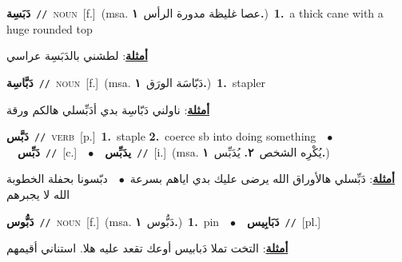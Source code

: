\documentclass[10pt,a4paper,twoside]{article} %
\begin{document}
\begin{multicols}{2}
{\setlength\topsep{0pt}\textbf{\foreignlanguage{arabic}{دَبَسِة}}\ {\color{gray}\texttt{//}\color{black}}\ \textsc{noun}\ [f.]\ \color{gray}(msa. \foreignlanguage{arabic}{عصا غليظة مدورة الرأس}~\foreignlanguage{arabic}{\textbf{١.}})\color{black}\ \textbf{1.}~a thick cane with a huge rounded top\  \begin{flushright}\color{gray}\foreignlanguage{arabic}{\textbf{\underline{\foreignlanguage{arabic}{أمثلة}}}: لطشني بالدَبَسِة عراسي}\end{flushright}\color{black}} \vspace{2mm}

{\setlength\topsep{0pt}\textbf{\foreignlanguage{arabic}{دَبَّاسِة}}\ {\color{gray}\texttt{//}\color{black}}\ \textsc{noun}\ [f.]\ \color{gray}(msa. \foreignlanguage{arabic}{دَبّاسَة الورَق}~\foreignlanguage{arabic}{\textbf{١.}})\color{black}\ \textbf{1.}~stapler\  \begin{flushright}\color{gray}\foreignlanguage{arabic}{\textbf{\underline{\foreignlanguage{arabic}{أمثلة}}}: ناولني دَبّاسِة بدي أدَبِّسلي هالكم ورقة}\end{flushright}\color{black}} \vspace{2mm}

{\setlength\topsep{0pt}\textbf{\foreignlanguage{arabic}{دَبَّس}}\ {\color{gray}\texttt{//}\color{black}}\ \textsc{verb}\ [p.]\ \textbf{1.}~staple  \textbf{2.}~coerce sb into doing something\ \ $\bullet$\ \ \setlength\topsep{0pt}\textbf{\foreignlanguage{arabic}{دَبِّس}}\ {\color{gray}\texttt{//}\color{black}}\ [c.]\ \ $\bullet$\ \ \setlength\topsep{0pt}\textbf{\foreignlanguage{arabic}{يدَبِّس}}\ {\color{gray}\texttt{//}\color{black}}\ [i.]\ \color{gray}(msa. \foreignlanguage{arabic}{يُكْرِه الشخص}~\foreignlanguage{arabic}{\textbf{٢.}}  \foreignlanguage{arabic}{يُدَبِّس}~\foreignlanguage{arabic}{\textbf{١.}})\color{black}\  \begin{flushright}\color{gray}\foreignlanguage{arabic}{\textbf{\underline{\foreignlanguage{arabic}{أمثلة}}}: دَبِّسلي هالأوراق الله يرضى عليك بدي اياهم بسرعة\ $\bullet$\ \  دبّسونا بحفلة الخطوبة الله لا يجبرهم}\end{flushright}\color{black}} \vspace{2mm}

{\setlength\topsep{0pt}\textbf{\foreignlanguage{arabic}{دَبُّوس}}\ {\color{gray}\texttt{//}\color{black}}\ \textsc{noun}\ [f.]\ \color{gray}(msa. \foreignlanguage{arabic}{دَبُّوس}~\foreignlanguage{arabic}{\textbf{١.}})\color{black}\ \textbf{1.}~pin\ \ $\bullet$\ \ \setlength\topsep{0pt}\textbf{\foreignlanguage{arabic}{دَبَابِيس}}\ {\color{gray}\texttt{//}\color{black}}\ [pl.]\  \begin{flushright}\color{gray}\foreignlanguage{arabic}{\textbf{\underline{\foreignlanguage{arabic}{أمثلة}}}: التخت تملا دَبابيس أوعك تقعد عليه هلا. استناني أقيمهم}\end{flushright}\color{black}} \vspace{2mm}


\end{multicols}
\end{document}

